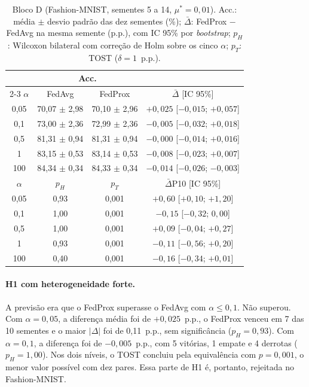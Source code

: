 \begin{table}[ht]
    \centering\small
    \caption{Bloco D (Fashion-MNIST, sementes 5 a 14, $\mu^* = 0{,}01$). Acc.: média $\pm$ desvio padrão das dez sementes (\%); $\bar\Delta$: FedProx $-$ FedAvg na mesma semente (p.p.), com IC 95\% por \textit{bootstrap}; $p_H$: Wilcoxon bilateral com correção de Holm sobre os cinco $\alpha$; $p_T$: TOST ($\delta = 1$~p.p.).}
    \label{tab:blocoD}
    \setlength{\tabcolsep}{2.5pt}
    \begin{tabular}{@{}cccc@{}}
        \toprule
        & \multicolumn{2}{c}{Acc.} & \\
        \cmidrule(lr){2-3}
        $\alpha$ & FedAvg & FedProx & $\bar\Delta$ [IC 95\%] \\
        \midrule
        0,05 & 70{,}07 $\pm$ 2{,}98 & 70{,}10 $\pm$ 2{,}96 & $+0{,}025$ [$-0{,}015$; $+0{,}057$] \\
        0,1  & 73{,}00 $\pm$ 2{,}36 & 72{,}99 $\pm$ 2{,}36 & $-0{,}005$ [$-0{,}032$; $+0{,}018$] \\
        0,5  & 81{,}31 $\pm$ 0{,}94 & 81{,}31 $\pm$ 0{,}94 & $-0{,}000$ [$-0{,}014$; $+0{,}016$] \\
        1    & 83{,}15 $\pm$ 0{,}53 & 83{,}14 $\pm$ 0{,}53 & $-0{,}008$ [$-0{,}023$; $+0{,}007$] \\
        100  & 84{,}34 $\pm$ 0{,}34 & 84{,}33 $\pm$ 0{,}34 & $-0{,}014$ [$-0{,}026$; $-0{,}003$] \\
        \midrule
        $\alpha$ & $p_H$ & $p_T$ & $\bar\Delta$P10 [IC 95\%] \\
        \midrule
        0,05 & 0{,}93 & 0{,}001 & $+0{,}60$ [$+0{,}10$; $+1{,}20$] \\
        0,1  & 1{,}00 & 0{,}001 & $-0{,}15$ [$-0{,}32$; $0{,}00$] \\
        0,5  & 1{,}00 & 0{,}001 & $+0{,}09$ [$-0{,}04$; $+0{,}27$] \\
        1    & 0{,}93 & 0{,}001 & $-0{,}11$ [$-0{,}56$; $+0{,}20$] \\
        100  & 0{,}40 & 0{,}001 & $-0{,}16$ [$-0{,}34$; $+0{,}01$] \\
        \bottomrule
    \end{tabular}
\end{table}

\paragraph{H1 com heterogeneidade forte.} A previsão era que o FedProx superasse o FedAvg com $\alpha \leq 0{,}1$. Não superou. Com $\alpha = 0{,}05$, a diferença média foi de $+0{,}025$~p.p., o FedProx venceu em 7 das 10 sementes e o maior $|\Delta|$ foi de 0,11~p.p., sem significância ($p_H = 0{,}93$). Com $\alpha = 0{,}1$, a diferença foi de $-0{,}005$~p.p., com 5 vitórias, 1 empate e 4 derrotas ($p_H = 1{,}00$). Nos dois níveis, o TOST concluiu pela equivalência com $p = 0{,}001$, o menor valor possível com dez pares. Essa parte de H1 é, portanto, rejeitada no Fashion-MNIST.

